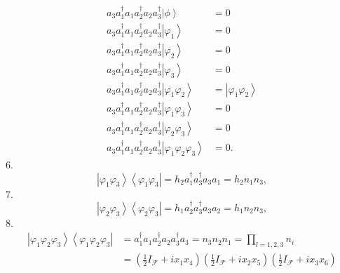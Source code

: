 \documentclass[aps,preprint]{revtex4}%
\begin{document}
\begin{align}
a_{3}a_{1}^{\dagger}a_{1}a_{2}^{\dagger}a_{2}a_{3}^{\dagger}\left\vert
\phi\right\rangle  &  =0\\
a_{3}a_{1}^{\dagger}a_{1}a_{2}^{\dagger}a_{2}a_{3}^{\dagger}\left\vert
\varphi_{1}\right\rangle  &  =0\\
a_{3}a_{1}^{\dagger}a_{1}a_{2}^{\dagger}a_{2}a_{3}^{\dagger}\left\vert
\varphi_{2}\right\rangle  &  =0\\
a_{3}a_{1}^{\dagger}a_{1}a_{2}^{\dagger}a_{2}a_{3}^{\dagger}\left\vert
\varphi_{3}\right\rangle  &  =0\\
a_{3}a_{1}^{\dagger}a_{1}a_{2}^{\dagger}a_{2}a_{3}^{\dagger}\left\vert
\varphi_{1}\varphi_{2}\right\rangle  &  =\left\vert \varphi_{1}\varphi
_{2}\right\rangle \\
a_{3}a_{1}^{\dagger}a_{1}a_{2}^{\dagger}a_{2}a_{3}^{\dagger}\left\vert
\varphi_{1}\varphi_{3}\right\rangle  &  =0\\
a_{3}a_{1}^{\dagger}a_{1}a_{2}^{\dagger}a_{2}a_{3}^{\dagger}\left\vert
\varphi_{2}\varphi_{3}\right\rangle  &  =0\\
a_{3}a_{1}^{\dagger}a_{1}a_{2}^{\dagger}a_{2}a_{3}^{\dagger}\left\vert
\varphi_{1}\varphi_{2}\varphi_{3}\right\rangle  &  =0.
\end{align}
6.%
\begin{equation}
\left\vert \varphi_{1}\varphi_{3}\right\rangle \left\langle \varphi_{1}%
\varphi_{3}\right\vert =h_{2}a_{1}^{\dagger}a_{3}^{\dagger}a_{3}a_{1}%
=h_{2}n_{1}n_{3},
\end{equation}
7.%
\begin{equation}
\left\vert \varphi_{2}\varphi_{3}\right\rangle \left\langle \varphi_{2}%
\varphi_{3}\right\vert =h_{1}a_{2}^{\dagger}a_{3}^{\dagger}a_{3}a_{2}%
=h_{1}n_{2}n_{3},
\end{equation}
8.%
\begin{align}
\left\vert \varphi_{1}\varphi_{2}\varphi_{3}\right\rangle \left\langle
\varphi_{1}\varphi_{2}\varphi_{3}\right\vert  &  =a_{1}^{\dagger}a_{1}%
a_{2}^{\dagger}a_{2}a_{3}^{\dagger}a_{3}=n_{3}n_{2}n_{1}=%
{\displaystyle\prod\limits_{l=1,2,3}}
n_{i}\\
&  =\left(  \frac{1}{2}I_{\mathcal{F}}+ix_{1}x_{4}\right)  \left(  \frac{1}%
{2}I_{\mathcal{F}}+ix_{2}x_{5}\right)  \left(  \frac{1}{2}I_{\mathcal{F}%
}+ix_{3}x_{6}\right)
\end{align}
\end{document}
